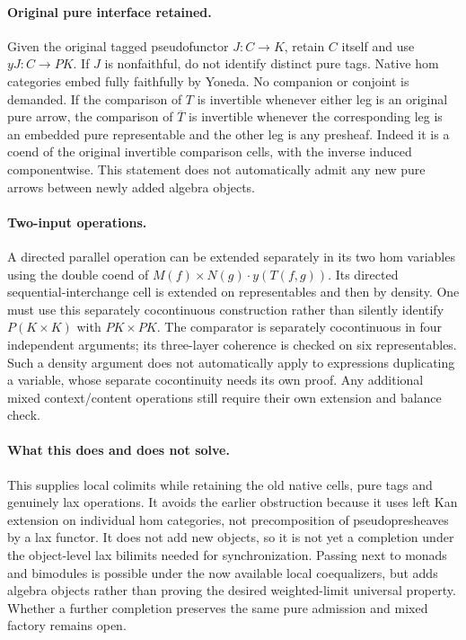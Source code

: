 \documentclass{article}
\begin{document}
\paragraph{Original pure interface retained.} Given the original tagged pseudofunctor $J:C\to K$, retain $C$ itself and use $yJ:C\to PK$. If $J$ is nonfaithful, do not identify distinct pure tags. Native hom categories embed fully faithfully by Yoneda. No companion or conjoint is demanded. If the comparison of $T$ is invertible whenever either leg is an original pure arrow, the comparison of $\overline T$ is invertible whenever the corresponding leg is an embedded pure representable and the other leg is any presheaf. Indeed it is a coend of the original invertible comparison cells, with the inverse induced componentwise. This statement does not automatically admit any new pure arrows between newly added algebra objects.

\paragraph{Two-input operations.} A directed parallel operation can be extended separately in its two hom variables using the double coend of $M(f)\times N(g)\cdot y(T(f,g))$. Its directed sequential-interchange cell is extended on representables and then by density. One must use this separately cocontinuous construction rather than silently identify $P(K\times K)$ with $PK\times PK$. The comparator is separately cocontinuous in four independent arguments; its three-layer coherence is checked on six representables. Such a density argument does not automatically apply to expressions duplicating a variable, whose separate cocontinuity needs its own proof. Any additional mixed context/content operations still require their own extension and balance check.

\paragraph{What this does and does not solve.} This supplies local colimits while retaining the old native cells, pure tags and genuinely lax operations. It avoids the earlier obstruction because it uses left Kan extension on individual hom categories, not precomposition of pseudopresheaves by a lax functor. It does not add new objects, so it is not yet a completion under the object-level lax bilimits needed for synchronization. Passing next to monads and bimodules is possible under the now available local coequalizers, but adds algebra objects rather than proving the desired weighted-limit universal property. Whether a further completion preserves the same pure admission and mixed factory remains open.
\end{document}
